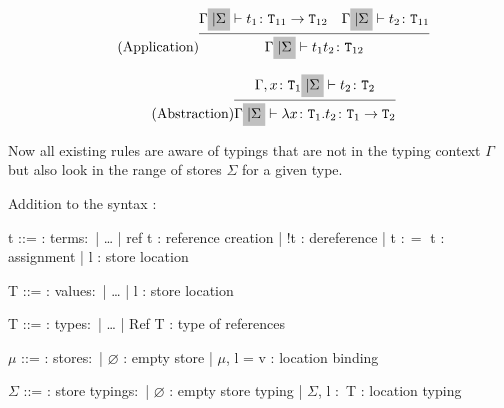 \begin{equation*}
    \tag{Application}
    \infer{
        \Gamma \colorbox{lightgray}{$| \Sigma$} \vdash t_1 t_2 \colon \texttt{T}_{12}
    }{
        \Gamma \colorbox{lightgray}{$| \Sigma$} \vdash t_1 \colon \texttt{T}_{11} \rightarrow \texttt{T}_{12}
        &
        \Gamma \colorbox{lightgray}{$| \Sigma$} \vdash t_2 \colon \texttt{T}_{11}
    }
\end{equation*}

\begin{equation*}
    \tag{Abstraction}
    \infer{
        \Gamma \colorbox{lightgray}{$| \Sigma$} \vdash \lambda x \colon \texttt{T}_1 . t_2 \colon \texttt{T}_1 \rightarrow \texttt{T}_2
    }{
        \Gamma,x \colon \texttt{T}_1 \colorbox{lightgray}{$| \Sigma$} \vdash t_2 \colon \texttt{T}_2
    }
\end{equation*}

Now all existing rules are aware of typings that are not in the typing context
$\Gamma$ but also look in the range of stores $\Sigma$ for a given type.

Addition to the syntax \cite{pierce2002ProgLang}:
\begin{bnfgrammar}
    t ::= : terms$\colon$
    | \dots
    | ref t : reference creation
    | !t : dereference
    | t $\colon=$ t : assignment
    | l : store location
\end{bnfgrammar}\leavevmode\newline

\begin{bnfgrammar}
    T ::= : values$\colon$
    | \dots
    | l : store location
\end{bnfgrammar}\leavevmode\newline

\begin{bnfgrammar}
    T ::= : types$\colon$
    | \dots
    | Ref T : type of references
\end{bnfgrammar}\leavevmode\newline

\begin{bnfgrammar}
    $\mu$ ::= : stores$\colon$
    | $\varnothing$ : empty store
    | $\mu$, l = v : location binding
\end{bnfgrammar}\leavevmode\newline

\begin{bnfgrammar}
    $\Sigma$ ::= : store typings$\colon$
    | $\varnothing$ : empty store typing
    | $\Sigma$, l $\colon$ T : location typing
\end{bnfgrammar}\leavevmode\newline

